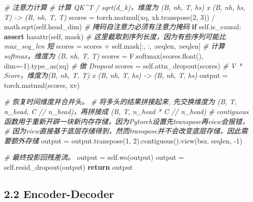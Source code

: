 \documentclass[
]{article}
\newenvironment{Shaded}{}{}
\newcommand{\BuiltInTok}[1]{\textcolor[rgb]{0.00,0.50,0.00}{#1}}
\newcommand{\CommentTok}[1]{\textcolor[rgb]{0.38,0.63,0.69}{\textit{#1}}}
\newcommand{\ControlFlowTok}[1]{\textcolor[rgb]{0.00,0.44,0.13}{\textbf{#1}}}
\newcommand{\DecValTok}[1]{\textcolor[rgb]{0.25,0.63,0.44}{#1}}
\newcommand{\NormalTok}[1]{#1}
\newcommand{\OperatorTok}[1]{\textcolor[rgb]{0.40,0.40,0.40}{#1}}
\newcommand{\StringTok}[1]{\textcolor[rgb]{0.25,0.44,0.63}{#1}}
\newcommand{\VariableTok}[1]{\textcolor[rgb]{0.10,0.09,0.49}{#1}}
\begin{document}
\begin{Shaded}
\begin{Highlighting}[]
        \CommentTok{\# 注意力计算}
        \CommentTok{\# 计算 QK\^{}T / sqrt(d\_k)，维度为 (B, nh, T, hs) x (B, nh, hs, T) {-}\textgreater{} (B, nh, T, T)}
\NormalTok{        scores }\OperatorTok{=}\NormalTok{ torch.matmul(xq, xk.transpose(}\DecValTok{2}\NormalTok{, }\DecValTok{3}\NormalTok{)) }\OperatorTok{/}\NormalTok{ math.sqrt(}\VariableTok{self}\NormalTok{.head\_dim)}
        \CommentTok{\# 掩码自注意力必须有注意力掩码}
        \ControlFlowTok{if} \VariableTok{self}\NormalTok{.is\_causal:}
            \ControlFlowTok{assert} \BuiltInTok{hasattr}\NormalTok{(}\VariableTok{self}\NormalTok{, }\StringTok{\textquotesingle{}mask\textquotesingle{}}\NormalTok{)}
            \CommentTok{\# 这里截取到序列长度，因为有些序列可能比 max\_seq\_len 短}
\NormalTok{            scores }\OperatorTok{=}\NormalTok{ scores }\OperatorTok{+} \VariableTok{self}\NormalTok{.mask[:, :, :seqlen, :seqlen]}
        \CommentTok{\# 计算 softmax，维度为 (B, nh, T, T)}
\NormalTok{        scores }\OperatorTok{=}\NormalTok{ F.softmax(scores.}\BuiltInTok{float}\NormalTok{(), dim}\OperatorTok{={-}}\DecValTok{1}\NormalTok{).type\_as(xq)}
        \CommentTok{\# 做 Dropout}
\NormalTok{        scores }\OperatorTok{=} \VariableTok{self}\NormalTok{.attn\_dropout(scores)}
        \CommentTok{\# V * Score，维度为(B, nh, T, T) x (B, nh, T, hs) {-}\textgreater{} (B, nh, T, hs)}
\NormalTok{        output }\OperatorTok{=}\NormalTok{ torch.matmul(scores, xv)}

        \CommentTok{\# 恢复时间维度并合并头。}
        \CommentTok{\# 将多头的结果拼接起来, 先交换维度为 (B, T, n\_head, C // n\_head)，再拼接成 (B, T, n\_head * C // n\_head)}
        \CommentTok{\# contiguous 函数用于重新开辟一块新内存存储，因为Pytorch设置先transpose再view会报错，}
        \CommentTok{\# 因为view直接基于底层存储得到，然而transpose并不会改变底层存储，因此需要额外存储}
\NormalTok{        output }\OperatorTok{=}\NormalTok{ output.transpose(}\DecValTok{1}\NormalTok{, }\DecValTok{2}\NormalTok{).contiguous().view(bsz, seqlen, }\OperatorTok{{-}}\DecValTok{1}\NormalTok{)}

        \CommentTok{\# 最终投影回残差流。}
\NormalTok{        output }\OperatorTok{=} \VariableTok{self}\NormalTok{.wo(output)}
\NormalTok{        output }\OperatorTok{=} \VariableTok{self}\NormalTok{.resid\_dropout(output)}
        \ControlFlowTok{return}\NormalTok{ output}
\end{Highlighting}
\end{Shaded}

\subsection{2.2 Encoder-Decoder}\label{encoder-decoder}
\end{document}
